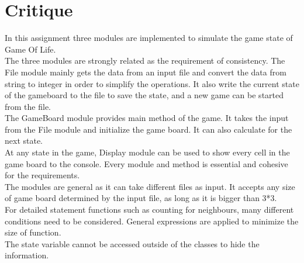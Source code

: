 \documentclass[12pt]{article}
\begin{document}
\section* {Critique}
In this assignment three modules are implemented to simulate the game state of Game Of Life.\\
The three modules are strongly related as the requirement of consistency. The File module mainly gets the data from an input file and convert the data from string to integer in order to simplify the operations. It also write the current state of the gameboard to the file to save the state, and a new game can be started from the file.\\
The GameBoard module provides main method of the game. It takes the input from the File module and initialize the game board. It can also calculate for the next state.\\
At any state in the game, Display module can be used to show every cell in the game board to the console. Every module and method is essential and cohesive for the requirements. \\
The modules are general as it can take different files as input. It accepts any size of game board determined by the input file, as long as it is bigger than 3*3. \\For detailed statement functions such as counting for neighbours, many different conditions need to be considered.  General expressions are applied to minimize the size of function.\\
The state variable cannot be accessed outside of the classes to hide the information.
\end{document}

